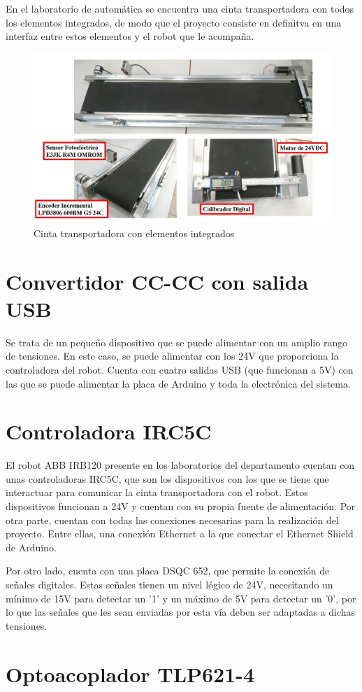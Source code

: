 En el laboratorio de automática se encuentra una cinta transportadora con todos los elementos integrados,
de modo que el proyecto consiste en definitva en una interfaz entre estos elementos y el robot que le
acompaña.

\begin{figure}[hbtp]
    \centering
    \includegraphics[width=\textwidth]{02-hardware/10-banda.png}
    \caption{Cinta transportadora con elementos integrados}
    \label{fig:figura210}
    \end{figure}

\section{Convertidor CC-CC con salida USB}

Se trata de un pequeño dispositivo que se puede alimentar con un amplio rango de tensiones. En este caso,
se puede alimentar con los 24V que proporciona la controladora del robot. Cuenta con cuatro salidas USB 
(que funcionan a 5V) con las que se puede alimentar la placa de Arduino y toda la electrónica del sistema.

\section{Controladora IRC5C}

El robot ABB IRB120 presente en los laboratorios del departamento cuentan con unas controladoras IRC5C,
que son los dispositivos con los que se tiene que interactuar para comunicar la cinta transportadora con
el robot. Estos dispositivos funcionan a 24V y cuentan con su propia fuente de alimentación. Por otra parte,
cuentan con todas las conexiones necesarias para la realización del proyecto. Entre ellas, una conexión Ethernet
a la que conectar el Ethernet Shield de Arduino.

Por otro lado, cuenta con una placa DSQC 652, que permite la conexión de señales digitales. Estas señales tienen
un nivel lógico de 24V, necesitando un mínimo de 15V para detectar un '1' y un máximo de 5V para detectar un '0',
por lo que las señales que les sean enviadas por esta vía deben ser adaptadas a dichas tensiones.

\section{Optoacoplador TLP621-4}

